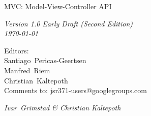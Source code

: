 \begin{titlepage}
\raggedleft

\vspace*{60pt}

{\Huge
\textsf{MVC: Model-View-Controller API}}

\vspace{20pt}

{
\Large\textit{Version 1.0 Early Draft (Second Edition)\\
\today}
}

\vspace{40pt}

{\large Editors:\\
Santiago\ Pericas-Geertsen\\
Manfred\ Riem\\
Christian\ Kaltepoth\\
\vspace{10pt}Comments to: jsr371-users@googlegroups.com
}

\vspace{80pt}

{\small\textit{Ivar\ Grimstad \& Christian Kaltepoth}
}
\end{titlepage} 
